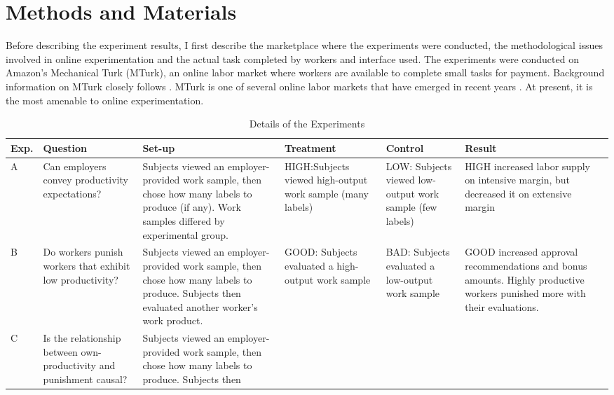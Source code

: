 \documentclass[12pt]{article}
\begin{document}
\section{Methods and Materials} 
Before describing the experiment results, I first describe the
marketplace where the experiments were conducted, the methodological
issues involved in online experimentation and the actual task
completed by workers and interface used. The experiments were
conducted on Amazon's Mechanical Turk (MTurk), an online labor market
where workers are available to complete small tasks for
payment. Background information on MTurk closely follows
\cite{horton2010labor}. MTurk is one of several online labor markets
that have emerged in recent years \citep{frei2009}. At present, it is
the most amenable to online experimentation.
\begin{table}
\caption{Details of the Experiments \label{overview}}
\begin{center}
\begin{tiny}
    \begin{tabular}{ l | p{3cm} | p{5cm} | p{2cm} | p{2cm} | p{3cm} }
     \small{Exp}. 
     & \small{Question} 
     & \small{Set-up} 
     & \small{Treatment} 
     & \small{Control} 
     & \small{Result} \\ 
    \hline A 
      & Can employers convey productivity expectations? 
      & Subjects viewed an employer-provided work sample, 
        then chose how many labels to produce (if any). Work 
        samples differed by experimental group. 
      & HIGH:Subjects viewed high-output work sample (many labels)
      & LOW: Subjects viewed low-output work sample (few labels)
      & HIGH increased labor supply on intensive margin, 
        but decreased it on extensive margin \\
    \hline  B 
      & Do workers punish workers that exhibit low productivity? 
      & Subjects viewed an employer-provided work sample, 
        then chose how many labels to produce. Subjects then 
        evaluated another worker's work product.  
      & GOOD: Subjects evaluated a high-output work sample
      & BAD:  Subjects evaluated a low-output work sample
      & GOOD increased approval recommendations and bonus amounts. 
        Highly productive workers punished more with their evaluations. \\
     \hline C
      & Is the relationship between own-productivity and punishment causal?
      & Subjects viewed an employer-provided work sample, 
        then chose how many labels to produce. Subjects then 

\end{tabular}
\end{tiny}
\end{center}
\end{table}
\end{document}
